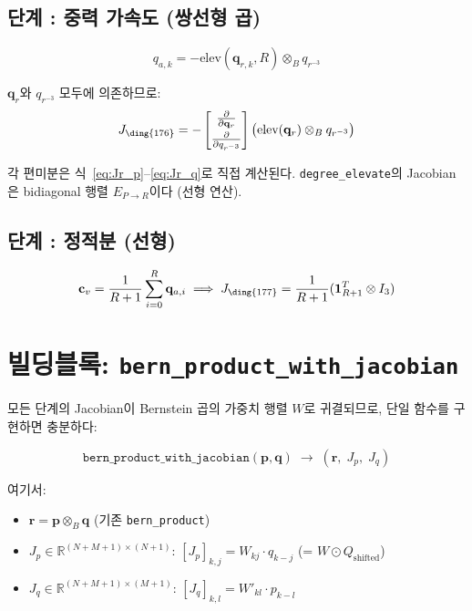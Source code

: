 \documentclass[11pt]{article}
\begin{document}
\subsection{단계 : 중력 가속도 (쌍선형 곱)}

\begin{equation}
  q_{a,k} = -\text{elev}(\mathbf{q}_{r,k}, R) \otimes_B q_{r^{-3}}
\end{equation}

$\mathbf{q}_r$와 $q_{r^{-3}}$ 모두에 의존하므로:
\begin{equation}
  J_{\ding{176}} = -\begin{bmatrix}
    \frac{\partial}{\partial\mathbf{q}_r} \\[4pt]
    \frac{\partial}{\partial q_{r^{-3}}}
  \end{bmatrix}
  \bigl(\text{elev}(\mathbf{q}_r) \otimes_B q_{r^{-3}}\bigr)
\end{equation}

각 편미분은 식~\eqref{eq:Jr_p}--\eqref{eq:Jr_q}로 직접 계산된다.
\texttt{degree\_elevate}의 Jacobian은 bidiagonal 행렬
$E_{P \to R}$이다 (선형 연산).

\subsection{단계 : 정적분 (선형)}

\begin{equation}
  \mathbf{c}_v = \frac{1}{R+1} \sum_{i=0}^R \mathbf{q}_{a,i}
  \implies
  J_{\ding{177}} = \frac{1}{R+1} (\mathbf{1}_{R+1}^T \otimes I_3)
  \label{eq:J6}
\end{equation}

\section{빌딩블록: \texttt{bern\_product\_with\_jacobian}}

모든 단계의 Jacobian이 Bernstein 곱의 가중치 행렬 $W$로 귀결되므로,
단일 함수를 구현하면 충분하다:

\begin{equation}
  \texttt{bern\_product\_with\_jacobian}(\mathbf{p}, \mathbf{q})
  \;\to\; (\mathbf{r},\; J_p,\; J_q)
\end{equation}

여기서:
\begin{itemize}
  \item $\mathbf{r} = \mathbf{p} \otimes_B \mathbf{q}$ \quad (기존 \texttt{bern\_product})
  \item $J_p \in \mathbb{R}^{(N+M+1) \times (N+1)}$: \quad
        $[J_p]_{k,j} = W_{kj} \cdot q_{k-j}$ \quad (= $W \odot Q_{\mathrm{shifted}}$)
  \item $J_q \in \mathbb{R}^{(N+M+1) \times (M+1)}$: \quad
        $[J_q]_{k,l} = W'_{kl} \cdot p_{k-l}$
\end{itemize}
\end{document}
